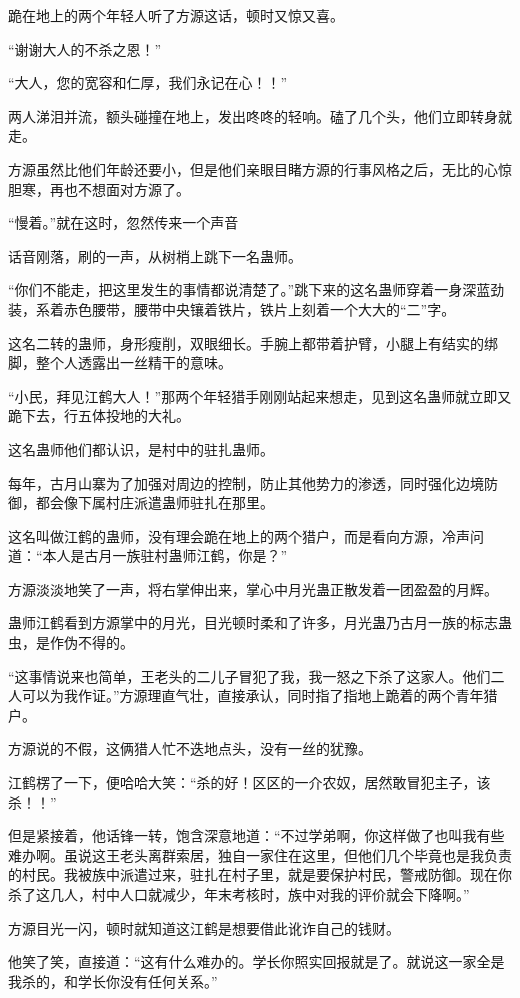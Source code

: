 \begin{this_body}
跪在地上的两个年轻人听了方源这话，顿时又惊又喜。

“谢谢大人的不杀之恩！”

“大人，您的宽容和仁厚，我们永记在心！！”

两人涕泪并流，额头碰撞在地上，发出咚咚的轻响。磕了几个头，他们立即转身就走。

方源虽然比他们年龄还要小，但是他们亲眼目睹方源的行事风格之后，无比的心惊胆寒，再也不想面对方源了。

“慢着。”就在这时，忽然传来一个声音

话音刚落，刷的一声，从树梢上跳下一名蛊师。

“你们不能走，把这里发生的事情都说清楚了。”跳下来的这名蛊师穿着一身深蓝劲装，系着赤色腰带，腰带中央镶着铁片，铁片上刻着一个大大的“二”字。

这名二转的蛊师，身形瘦削，双眼细长。手腕上都带着护臂，小腿上有结实的绑脚，整个人透露出一丝精干的意味。

“小民，拜见江鹤大人！”那两个年轻猎手刚刚站起来想走，见到这名蛊师就立即又跪下去，行五体投地的大礼。

这名蛊师他们都认识，是村中的驻扎蛊师。

每年，古月山寨为了加强对周边的控制，防止其他势力的渗透，同时强化边境防御，都会像下属村庄派遣蛊师驻扎在那里。

这名叫做江鹤的蛊师，没有理会跪在地上的两个猎户，而是看向方源，冷声问道：“本人是古月一族驻村蛊师江鹤，你是？”

方源淡淡地笑了一声，将右掌伸出来，掌心中月光蛊正散发着一团盈盈的月辉。

蛊师江鹤看到方源掌中的月光，目光顿时柔和了许多，月光蛊乃古月一族的标志蛊虫，是作伪不得的。

“这事情说来也简单，王老头的二儿子冒犯了我，我一怒之下杀了这家人。他们二人可以为我作证。”方源理直气壮，直接承认，同时指了指地上跪着的两个青年猎户。

方源说的不假，这俩猎人忙不迭地点头，没有一丝的犹豫。

江鹤楞了一下，便哈哈大笑：“杀的好！区区的一介农奴，居然敢冒犯主子，该杀！！”

但是紧接着，他话锋一转，饱含深意地道：“不过学弟啊，你这样做了也叫我有些难办啊。虽说这王老头离群索居，独自一家住在这里，但他们几个毕竟也是我负责的村民。我被族中派遣过来，驻扎在村子里，就是要保护村民，警戒防御。现在你杀了这几人，村中人口就减少，年末考核时，族中对我的评价就会下降啊。”

方源目光一闪，顿时就知道这江鹤是想要借此讹诈自己的钱财。

他笑了笑，直接道：“这有什么难办的。学长你照实回报就是了。就说这一家全是我杀的，和学长你没有任何关系。”


\end{this_body}
